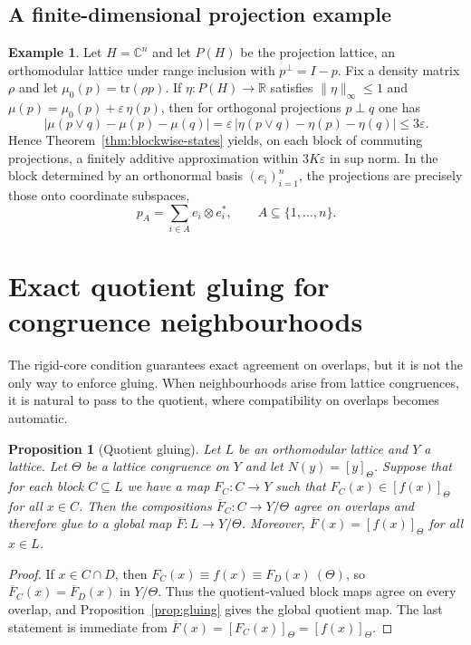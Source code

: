 \documentclass[11pt]{amsart}
\newtheorem{proposition}[theorem]{Proposition}
\theoremstyle{definition}
\newtheorem{example}[theorem]{Example}
\newcommand{\join}{\vee}
\begin{document}
\subsection{A finite-dimensional projection example}

\begin{example}\label{ex:proj}
Let $H=\mathbb{C}^n$ and let $P(H)$ be the projection lattice, an orthomodular lattice under range inclusion with $p^\perp=I-p$.
Fix a density matrix $\rho$ and let $\mu_0(p)=\mathrm{tr}(\rho p)$.
If $\eta\colon P(H)\to\mathbb{R}$ satisfies $\|\eta\|_\infty\le 1$ and $\mu(p)=\mu_0(p)+\varepsilon\,\eta(p)$,
then for orthogonal projections $p\perp q$ one has
\[
|\mu(p\join q)-\mu(p)-\mu(q)|=\varepsilon\,|\eta(p\join q)-\eta(p)-\eta(q)|\le 3\varepsilon.
\]
Hence Theorem~\ref{thm:blockwise-states} yields, on each block of commuting projections, a finitely additive approximation within $3K\varepsilon$ in sup norm.
In the block determined by an orthonormal basis $(e_i)_{i=1}^n$, the projections are precisely those onto coordinate subspaces,
\[
p_A=\sum_{i\in A} e_i\otimes e_i^*,\qquad A\subseteq\{1,\dots,n\}.
\]
\end{example}

\section{Exact quotient gluing for congruence neighbourhoods}
The rigid-core condition guarantees exact agreement on overlaps, but it is not the only way
to enforce gluing.
When neighbourhoods arise from lattice congruences, it is natural to pass to the quotient,
where compatibility on overlaps becomes automatic.

\begin{proposition}[Quotient gluing]\label{prop:quotient-glue}
Let $L$ be an orthomodular lattice and $Y$ a lattice.
Let $\Theta$ be a lattice congruence on $Y$ and let $N(y)=[y]_\Theta$.
Suppose that for each block $C\subseteq L$ we have a map $F_C\colon C\to Y$ such that $F_C(x)\in [f(x)]_\Theta$ for all $x\in C$.
Then the compositions $\overline{F}_C\colon C\to Y/\Theta$ agree on overlaps and therefore glue to a global map $\overline{F}\colon L\to Y/\Theta$.
Moreover, $\overline{F}(x)=[f(x)]_\Theta$ for all $x\in L$.
\end{proposition}

\begin{proof}
If $x\in C\cap D$, then $F_C(x)\equiv f(x)\equiv F_D(x)\ (\Theta)$, so $\overline{F}_C(x)=\overline{F}_D(x)$ in $Y/\Theta$.
Thus the quotient-valued block maps agree on every overlap, and Proposition~\ref{prop:gluing} gives the global quotient map.
The last statement is immediate from $\overline{F}(x)=[F_C(x)]_\Theta=[f(x)]_\Theta$.
\end{proof}
\end{document}
